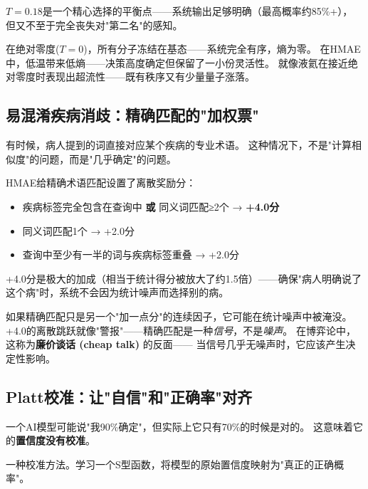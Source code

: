 \documentclass[11pt,a4paper]{ctexart}
\begin{document}
$T=0.18$是一个精心选择的平衡点——系统输出足够明确（最高概率约85\%+），
但又不至于完全丧失对"第二名"的感知。

\begin{exambox}
在绝对零度($T=0$)，所有分子冻结在基态——系统完全有序，熵为零。
在HMAE中，低温带来低熵——决策高度确定但保留了一小份灵活性。
就像液氦在接近绝对零度时表现出超流性——既有秩序又有少量量子涨落。
\end{exambox}

\subsection{易混淆疾病消歧：精确匹配的"加权票"}

有时候，病人提到的词直接对应某个疾病的专业术语。
这种情况下，不是"计算相似度"的问题，而是"几乎确定"的问题。

HMAE给精确术语匹配设置了离散奖励分：

\begin{itemize}[nosep]
\item 疾病标签完全包含在查询中 \textbf{或} 同义词匹配≥2个 → \textbf{+4.0分}
\item 同义词匹配1个 → +2.0分
\item 查询中至少有一半的词与疾病标签重叠 → +2.0分
\end{itemize}

+4.0分是极大的加成（相当于统计得分被放大了约1.5倍）——确保"病人明确说了这个病"时，系统不会因为统计噪声而选择别的病。

\begin{warnbox}[为什么不用连续得分？]
如果精确匹配只是另一个"加一点分"的连续因子，它可能在统计噪声中被淹没。
+4.0的离散跳跃就像"警报"——精确匹配是一种\emph{信号}，不是\emph{噪声}。
在博弈论中，这称为\textbf{廉价谈话 (cheap talk)} 的反面——
当信号几乎无噪声时，它应该产生决定性影响。
\end{warnbox}

\subsection{Platt校准：让"自信"和"正确率"对齐}

一个AI模型可能说"我90\%确定"，但实际上它只有70\%的时候是对的。
这意味着它的\textbf{置信度没有校准}。

\begin{defbox}
一种校准方法。学习一个S型函数，将模型的原始置信度映射为"真正的正确概率"。
\end{defbox}
\end{document}
